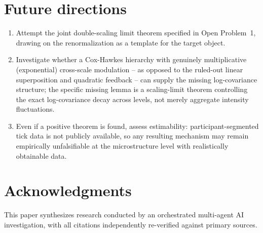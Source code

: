 \documentclass[11pt]{article}
\begin{document}
\section{Future directions}

\begin{enumerate}
\item Attempt the joint double-scaling limit theorem specified in Open Problem~1, drawing on the \citet{hagerneuman2020multiplicative} renormalization as a template for the target object.
\item Investigate whether a Cox-Hawkes hierarchy with genuinely multiplicative (exponential) cross-scale modulation -- as opposed to the ruled-out linear superposition and quadratic feedback -- can supply the missing log-covariance structure; the specific missing lemma is a scaling-limit theorem controlling the exact log-covariance decay across levels, not merely aggregate intensity fluctuations.
\item Even if a positive theorem is found, assess estimability: participant-segmented tick data is not publicly available, so any resulting mechanism may remain empirically unfalsifiable at the microstructure level with realistically obtainable data.
\end{enumerate}

\section*{Acknowledgments}
This paper synthesizes research conducted by an orchestrated multi-agent AI investigation, with all citations independently re-verified against primary sources.
\end{document}
